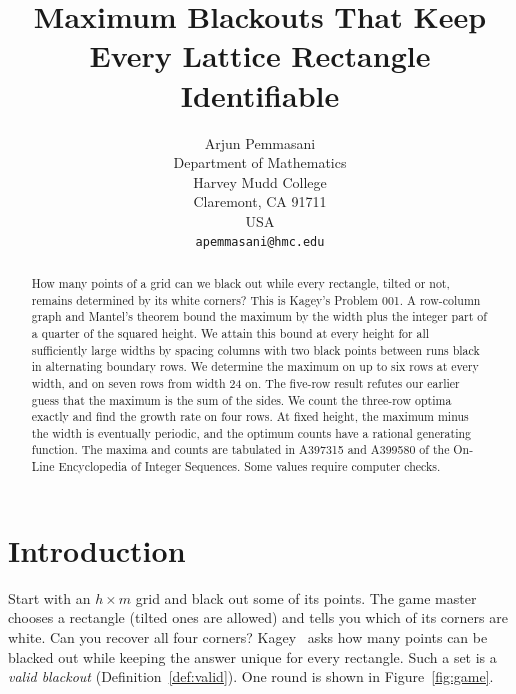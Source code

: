 \documentclass[12pt]{article}
\title{Maximum Blackouts That Keep Every Lattice Rectangle Identifiable}
\author{Arjun Pemmasani\\
Department of Mathematics\\
Harvey Mudd College\\
Claremont, CA 91711\\
USA\\
\texttt{apemmasani@hmc.edu}}
\date{}
\theoremstyle{plain}
\theoremstyle{definition}
\theoremstyle{remark}
\begin{document}
\maketitle

\begin{abstract}
How many points of a grid can we black out while every rectangle, tilted or not,
remains determined by its white corners? This is Kagey's Problem 001. A row-column
graph and Mantel's theorem bound the maximum by the width plus the integer part
of a quarter of the squared height. We attain this bound at every height for all
sufficiently large widths by spacing columns with two black points between runs
black in alternating boundary rows. We determine
the maximum on up to six rows at every width, and on seven rows from width 24 on.
The five-row result refutes our earlier guess that the maximum is the sum of the
sides. We count the three-row optima exactly and find the growth rate on four rows.
At fixed height, the maximum minus the width is eventually periodic, and the
optimum counts have a rational generating function. The maxima and counts are
tabulated in A397315 and A399580 of the On-Line Encyclopedia of Integer Sequences.
Some values require computer checks.
\end{abstract}

\section{Introduction}\label{sec:intro}

Start with an $h\times m$ grid and black out some of its points.
The game master chooses a rectangle (tilted ones are allowed) and tells
you which of its corners are white. Can you recover all four corners?
Kagey~\cite{kageyG4G14,kagey001} asks how many points can be blacked out
while keeping the answer unique for every rectangle.
Such a set is a \emph{valid blackout} (Definition~\ref{def:valid}).
One round is shown in Figure~\ref{fig:game}.
\end{document}
